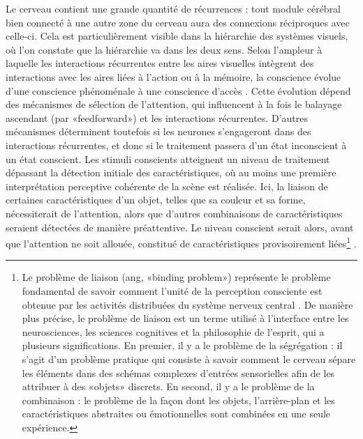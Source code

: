 Le cerveau contient une grande quantité de récurrences : tout module cérébral bien connecté à une autre zone du cerveau aura des connexions réciproques avec celle-ci. 
Cela est particulièrement visible dans la hiérarchie des systèmes visuels, où l'on constate que la hiérarchie va dans les deux sens. 
Selon l'ampleur à laquelle les interactions récurrentes entre les aires visuelles intègrent des interactions avec les aires liées à l'action ou à la mémoire, la conscience évolue d'une conscience phénoménale à une conscience d'accès \citep{lamme2003visual}. 
Cette évolution dépend des mécanismes de sélection de l'attention, qui influencent à la fois le balayage ascendant (par «feedforward») et les interactions récurrentes. 
D'autres mécanismes déterminent toutefois si les neurones s'engageront dans des interactions récurrentes, et donc si le traitement passera d'un état inconscient à un état conscient. 
Les stimuli conscients atteignent un niveau de traitement dépassant la détection initiale des caractéristiques, où au moins une première interprétation perceptive cohérente de la scène est réalisée. 
Ici, la liaison de certaines caractéristiques d'un objet, telles que sa couleur et sa forme, nécessiterait de l'attention, alors que d'autres combinaisons de caractéristiques seraient détectées de manière préattentive. 
Le niveau conscient serait alors, avant que l'attention ne soit allouée, constitué de caractéristiques provisoirement liées\footnote{Le problème de liaison (ang, «binding problem») représente le problème fondamental de savoir comment l'unité de la perception consciente est obtenue par les activités distribuées du système nerveux central \citep{revonsuo1999binding}. De manière plus précise, le problème de liaison est un terme utilisé à l'interface entre les neurosciences, les sciences cognitives et la philosophie de l'esprit, qui a plusieurs significations. En premier, il y a le problème de la ségrégation : il s'agit d'un problème pratique qui consiste à savoir comment le cerveau sépare les éléments dans des schémas complexes d'entrées sensorielles afin de les attribuer à des «objets» discrets. En second, il y a le problème de la combinaison : le problème de la façon dont les objets, l'arrière-plan et les caractéristiques abstraites ou émotionnelles sont combinées en une seule expérience.} \citep{lamme2003visual}. 


